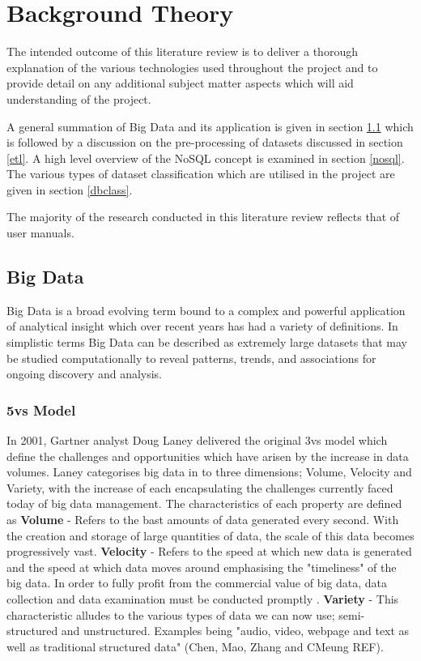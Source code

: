 \chapter{Background Theory}
The intended outcome of this literature review is to deliver a thorough explanation of the various technologies used throughout the project and to provide detail on any additional subject matter aspects which will aid understanding of the project. 

A general summation of Big Data and its application is given in section \ref{bigdata} which is followed by a discussion on the pre-processing of datasets discussed in section \ref{etl}. A high level overview of the NoSQL concept is examined in section \ref{nosql}. The various types of dataset classification which are utilised in the project are given in section \ref{dbclass}.

The majority of the research conducted in this literature review reflects that of user manuals.

\section{Big Data}\label{bigdata}
Big Data is a broad evolving term bound to a complex and powerful application of analytical insight which over recent years has had a variety of definitions. In simplistic terms Big Data can be described as extremely large datasets that may be studied computationally to reveal patterns, trends, and associations for ongoing discovery and analysis.

\subsection{5vs Model}
In 2001, Gartner analyst Doug Laney delivered the original 3vs model which define the challenges and opportunities which have arisen by the increase in data volumes. Laney categorises big data in to three dimensions; Volume, Velocity and Variety, with the increase of each encapsulating the challenges currently faced today of big data management. The characteristics of each property are defined as \textbf{Volume} - Refers to the bast amounts of data generated every second. With the creation and storage of large quantities of data, the scale of this data becomes progressively vast. \textbf{Velocity} - Refers to the speed at which new data is generated and the speed at which data moves around emphasising the "timeliness" of the big data. In order to fully profit from the commercial value of big data, data collection and data examination must be conducted promptly . \textbf{Variety} - This characteristic alludes to the various types of data we can now use; semi-structured and unstructured. Examples being "audio, video, webpage and text as well as traditional structured data" (Chen, Mao, Zhang and CMeung REF).

